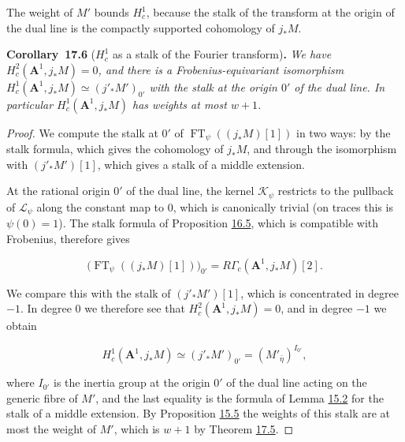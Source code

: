 \documentclass[11pt]{article}
\newenvironment{bpstatement}[2]{\par\addvspace{0.6\baselineskip}\noindent\textbf{#1}#2\textbf{.}\enspace\ignorespaces}
  {\par\addvspace{0.4\baselineskip}}
\newenvironment{bpstatementit}[2]{\begin{bpstatement}{#1}{#2}\itshape\ignorespaces}{\end{bpstatement}}
\begin{document}
The weight of \(M'\) bounds \(H^1_c\), because the stalk of the transform at the origin of the dual line is the compactly supported cohomology of \(j_*M\).

\label{bp241}%
\begin{bpstatementit}{Corollary~17.6}{ ($H^1_c$ as a stalk of the Fourier transform)}
We have \(H_c^2(\mathbf A^1,j_*M)=0\), and there is a Frobenius-equivariant isomorphism \(H_c^1(\mathbf A^1,j_*M)\simeq(j'_*M')_{0'}\) with the stalk at the origin \(0'\) of the dual line. In particular \(H_c^1(\mathbf A^1,j_*M)\) has weights at most \(w+1\).
\end{bpstatementit}

\begin{proof}[{Proof}]\label{bp242}%
We compute the stalk at \(0'\) of \(\operatorname{FT}_\psi((j_*M)[1])\) in two ways: by the stalk formula, which gives the cohomology of \(j_*M\), and through the isomorphism with \((j'_*M')[1]\), which gives a stalk of a middle extension.

At the rational origin \(0'\) of the dual line, the kernel \(\mathcal K_\psi\) restricts to the pullback of \(\mathcal L_\psi\) along the constant map to \(0\), which is canonically trivial (on traces this is \(\psi(0)=1\)). The stalk formula of Proposition \hyperref[bp183]{16.5}, which is compatible with Frobenius, therefore gives

\[
\bigl(\operatorname{FT}_\psi((j_*M)[1])\bigr)_{0'}
=R\Gamma_c(\mathbf A^1,j_*M)[2].
\]

We compare this with the stalk of \((j'_*M')[1]\), which is concentrated in degree \(-1\). In degree \(0\) we therefore see that \(H_c^2(\mathbf A^1,j_*M)=0\), and in degree \(-1\) we obtain

\[
H_c^1(\mathbf A^1,j_*M)
\simeq(j'_*M')_{0'}
=(M'_{\bar\eta})^{I_{0'}},
\]

where \(I_{0'}\) is the inertia group at the origin \(0'\) of the dual line acting on the generic fibre of \(M'\), and the last equality is the formula of Lemma \hyperref[bp127]{15.2} for the stalk of a middle extension. By Proposition \hyperref[bp134]{15.5} the weights of this stalk are at most the weight of \(M'\), which is \(w+1\) by Theorem \hyperref[bp238]{17.5}.
\end{proof}
\end{document}
